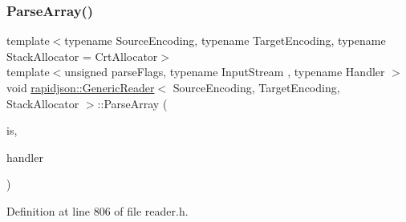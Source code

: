 \subsubsection{\texorpdfstring{ParseArray()}{ParseArray()}}
{\footnotesize\ttfamily template$<$typename Source\+Encoding, typename Target\+Encoding, typename Stack\+Allocator = Crt\+Allocator$>$ \\
template$<$unsigned parse\+Flags, typename Input\+Stream , typename Handler $>$ \\
void \mbox{\hyperlink{classrapidjson_1_1_generic_reader}{rapidjson\+::\+Generic\+Reader}}$<$ Source\+Encoding, Target\+Encoding, Stack\+Allocator $>$\+::Parse\+Array (\begin{DoxyParamCaption}\item[{Input\+Stream \&}]{is,  }\item[{\mbox{\hyperlink{classrapidjson_1_1_handler}{Handler}} \&}]{handler }\end{DoxyParamCaption})\hspace{0.3cm}{\ttfamily [private]}}



Definition at line 806 of file reader.\+h.


